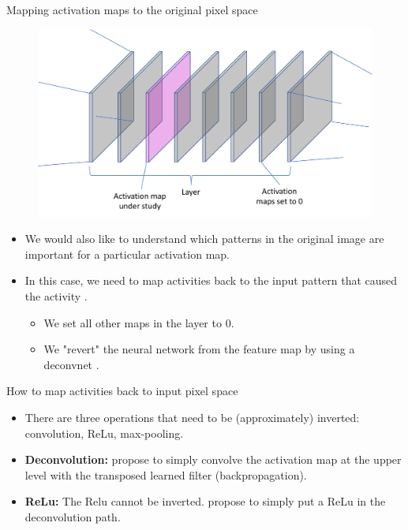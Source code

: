 \documentclass[xcolor=pdftex,dvipsnames,table]{beamer}
\begin{document}
\begin{frame}{Mapping activation maps to the original pixel space}
\begin{figure}[htb]
  \centering
  \includegraphics[width=.7\textwidth]{../graphics/Vis_activationmaps_zero.pdf}
\end{figure}
\begin{itemize}
	\item We would also like to understand which patterns in the original image are important for a particular activation map.
	\item In this case, we need to map activities back to the input pattern that caused the activity \cite{Zeiler:2013}. 
	\begin{itemize}
		\item We set all other maps in the layer to 0. 
		\item We "revert" the neural network from the feature map by using a deconvnet \cite{Zeiler:2011}.
	\end{itemize}
\end{itemize}
\end{frame}

\begin{frame}{How to map activities back to input pixel space}
\begin{itemize}
	\item There are three operations that need to be (approximately) inverted: convolution, ReLu, max-pooling. 
	\item {\bf Deconvolution:} \cite{Zeiler:2013} propose to simply convolve the activation map at the upper level with the transposed learned filter (backpropagation). 
	\item {\bf ReLu:} The Relu cannot be inverted. \cite{Zeiler:2013}  propose to simply put a ReLu in the deconvolution path. 
\end{itemize}
\end{frame}
\end{document}
